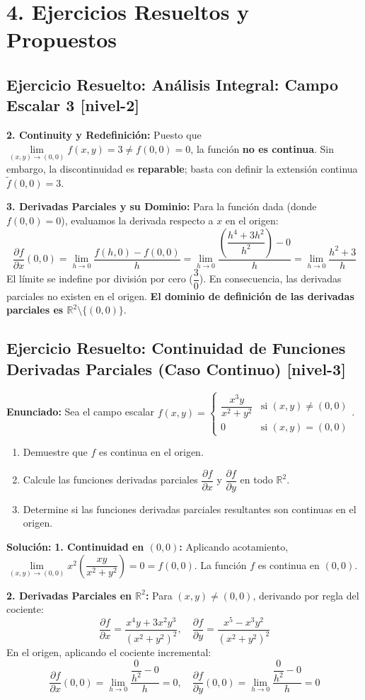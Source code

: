 \documentclass[11pt]{article}
\newenvironment{ejercicios}{%
  \section*{4. Ejercicios Resueltos y Propuestos}%
}{}
\newenvironment{ejercicioresuelto}[2]{\subsection*{Ejercicio Resuelto: #1 \small{[#2]}}}{}
\newcommand{\enunciado}[1]{\textbf{Enunciado:} #1\par\vspace{0.2cm}}
\newcommand{\solucion}[1]{\textbf{Solución:} #1\par\vspace{0.4cm}}
\begin{document}
\begin{ejercicios}
\begin{ejercicioresuelto}{Análisis Integral: Campo Escalar 3}{nivel-2}
{      \textbf{2. Continuity y Redefinición:}
      Puesto que $\displaystyle \lim\limits_{(x,y)\to(0,0)} f(x,y) = 3 \neq f(0,0) = 0$, la función \textbf{no es continua}. Sin embargo, la discontinuidad es \textbf{reparable}; basta con definir la extensión continua $\tilde{f}(0,0) = 3$.
      
      \textbf{3. Derivadas Parciales y su Dominio:}
      Para la función dada (donde $f(0,0)=0$), evaluamos la derivada respecto a $x$ en el origen:
      $$ \displaystyle \dfrac{\partial f}{\partial x}(0,0) = \displaystyle \lim\limits_{h \to 0} \displaystyle \dfrac{f(h,0) - f(0,0)}{h} = \displaystyle \lim\limits_{h \to 0} \displaystyle \dfrac{\left(\displaystyle \dfrac{h^4+3h^2}{h^2}\right) - 0}{h} = \displaystyle \lim\limits_{h \to 0} \displaystyle \dfrac{h^2+3}{h} $$
      El límite se indefine por división por cero ($\dfrac{3}{0}$). En consecuencia, las derivadas parciales no existen en el origen.
      \textbf{El dominio de definición de las derivadas parciales es $\mathbb{R}^2 \setminus \{(0,0)\}$}.
    }
  \end{ejercicioresuelto}

  \begin{ejercicioresuelto}{Continuidad de Funciones Derivadas Parciales (Caso Continuo)}{nivel-3}
    \enunciado{
      Sea el campo escalar $f(x,y) = \begin{cases} \displaystyle \dfrac{x^3 y}{x^2 + y^2} & \text{si } (x,y) \neq (0,0) \\[1em] 0 & \text{si } (x,y) = (0,0) \end{cases}$.
      \begin{enumerate}
        \item Demuestre que $f$ es continua en el origen.
        \item Calcule las funciones derivadas parciales $\displaystyle \dfrac{\partial f}{\partial x}$ y $\displaystyle \dfrac{\partial f}{\partial y}$ en todo $\mathbb{R}^2$.
        \item Determine si las funciones derivadas parciales resultantes son continuas en el origen.
      \end{enumerate}
    }
    \solucion{
      \textbf{1. Continuidad en $(0,0)$:} Aplicando acotamiento, $\displaystyle \lim\limits_{(x,y)\to(0,0)} x^2 \left(\displaystyle \dfrac{xy}{x^2+y^2}\right) = 0 = f(0,0)$. La función $f$ es continua en $(0,0)$.

      \textbf{2. Derivadas Parciales en $\mathbb{R}^2$:}
      Para $(x,y) \neq (0,0)$, derivando por regla del cociente:
      $$ \displaystyle \dfrac{\partial f}{\partial x} = \displaystyle \dfrac{x^4 y + 3x^2 y^3}{(x^2+y^2)^2}, \quad \displaystyle \dfrac{\partial f}{\partial y} = \displaystyle \dfrac{x^5 - x^3 y^2}{(x^2+y^2)^2} $$
      En el origen, aplicando el cociente incremental:
      $$ \displaystyle \dfrac{\partial f}{\partial x}(0,0) = \displaystyle \lim\limits_{h \to 0} \displaystyle \dfrac{\displaystyle \dfrac{0}{h^2} - 0}{h} = 0, \quad \displaystyle \dfrac{\partial f}{\partial y}(0,0) = \displaystyle \lim\limits_{h \to 0} \displaystyle \dfrac{\displaystyle \dfrac{0}{h^2} - 0}{h} = 0 $$

}
\end{ejercicioresuelto}
\end{ejercicios}
\end{document}

